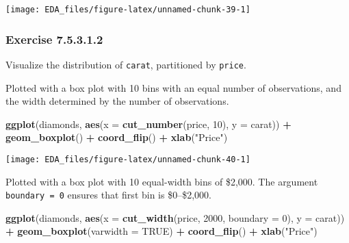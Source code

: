 \documentclass[]{book}
\newenvironment{Shaded}{\begin{snugshade}}{\end{snugshade}}
\newcommand{\DataTypeTok}[1]{\textcolor[rgb]{0.13,0.29,0.53}{#1}}
\newcommand{\DecValTok}[1]{\textcolor[rgb]{0.00,0.00,0.81}{#1}}
\newcommand{\KeywordTok}[1]{\textcolor[rgb]{0.13,0.29,0.53}{\textbf{#1}}}
\newcommand{\NormalTok}[1]{#1}
\newcommand{\OperatorTok}[1]{\textcolor[rgb]{0.81,0.36,0.00}{\textbf{#1}}}
\newcommand{\OtherTok}[1]{\textcolor[rgb]{0.56,0.35,0.01}{#1}}
\newcommand{\StringTok}[1]{\textcolor[rgb]{0.31,0.60,0.02}{#1}}
\theoremstyle{plain}
\theoremstyle{remark}
\begin{document}
\begin{center}\texttt{[image: EDA\_files/figure-latex/unnamed-chunk-39-1]} \end{center}

\hypertarget{exercise-7.5.3.1.2}{%
\subsubsection*{\texorpdfstring{Exercise
{7.5.3.1.2}}{Exercise 7.5.3.1.2}}\label{exercise-7.5.3.1.2}}

Visualize the distribution of \texttt{carat}, partitioned by
\texttt{price}.

Plotted with a box plot with 10 bins with an equal number of
observations, and the width determined by the number of observations.

\begin{Shaded}
\begin{Highlighting}[]
\KeywordTok{ggplot}\NormalTok{(diamonds, }\KeywordTok{aes}\NormalTok{(}\DataTypeTok{x =} \KeywordTok{cut_number}\NormalTok{(price, }\DecValTok{10}\NormalTok{), }\DataTypeTok{y =}\NormalTok{ carat)) }\OperatorTok{+}
\StringTok{  }\KeywordTok{geom_boxplot}\NormalTok{() }\OperatorTok{+}
\StringTok{  }\KeywordTok{coord_flip}\NormalTok{() }\OperatorTok{+}
\StringTok{  }\KeywordTok{xlab}\NormalTok{(}\StringTok{"Price"}\NormalTok{)}
\end{Highlighting}
\end{Shaded}

\begin{center}\texttt{[image: EDA\_files/figure-latex/unnamed-chunk-40-1]} \end{center}

Plotted with a box plot with 10 equal-width bins of \$2,000. The
argument \texttt{boundary\ =\ 0} ensures that first bin is \$0--\$2,000.

\begin{Shaded}
\begin{Highlighting}[]
\KeywordTok{ggplot}\NormalTok{(diamonds, }\KeywordTok{aes}\NormalTok{(}\DataTypeTok{x =} \KeywordTok{cut_width}\NormalTok{(price, }\DecValTok{2000}\NormalTok{, }\DataTypeTok{boundary =} \DecValTok{0}\NormalTok{), }\DataTypeTok{y =}\NormalTok{ carat)) }\OperatorTok{+}
\StringTok{  }\KeywordTok{geom_boxplot}\NormalTok{(}\DataTypeTok{varwidth =} \OtherTok{TRUE}\NormalTok{) }\OperatorTok{+}
\StringTok{  }\KeywordTok{coord_flip}\NormalTok{() }\OperatorTok{+}
\StringTok{  }\KeywordTok{xlab}\NormalTok{(}\StringTok{"Price"}\NormalTok{)}
\end{Highlighting}
\end{Shaded}
\end{document}
